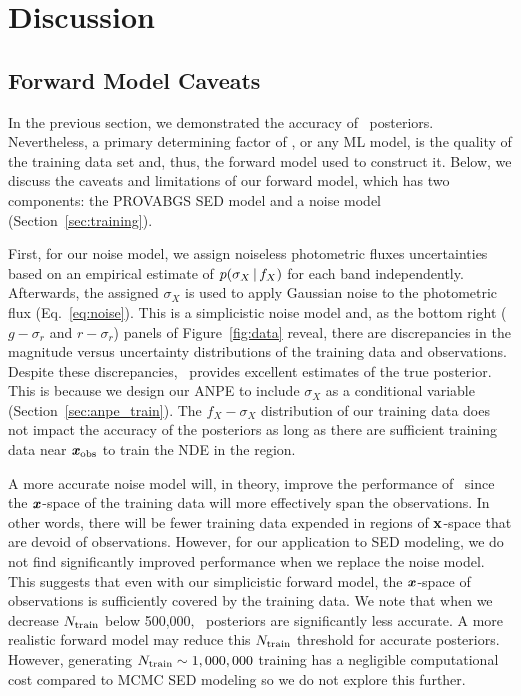 \section{Discussion} \label{sec:discuss}
\subsection{Forward Model Caveats} \label{sec:forward-model}
In the previous section, we demonstrated the accuracy of \sedflow~posteriors. 
Nevertheless, a primary determining factor of \sedflow, or any ML model, is
the quality of the training data set and, thus, the forward model used to
construct it. 
Below, we discuss the caveats and limitations of our forward model, which has
two components: the PROVABGS SED model and a noise model
(Section~\ref{sec:training}).

First, for our noise model, we assign noiseless photometric fluxes
uncertainties based on an empirical estimate of $p(\sigma_X\,|\, f_X)$ for
each band independently. 
Afterwards, the assigned $\sigma_X$ is used to apply Gaussian noise to the
photometric flux (Eq.~\ref{eq:noise}). 
This is a simplicistic noise model and, as the bottom right ($g - \sigma_r$ and
$r - \sigma_r$) panels of Figure~\ref{fig:data} reveal, there are discrepancies
in the magnitude versus uncertainty distributions of the training data and
observations. 
Despite these discrepancies, \sedflow~provides excellent estimates of the true
posterior.  
This is because we design our ANPE to include $\sigma_X$ as a conditional
variable (Section~\ref{sec:anpe_train}).
The $f_X-\sigma_X$ distribution of our training data does not impact the
accuracy of the posteriors as long as there are sufficient training data near
$\textbf{\textit{x}}_{\rm obs}$ to train the NDE in the region.

A more accurate noise model will, in theory, improve the performance of
\sedflow~since the $\textbf{\textit{x}}$-space of the training data will more effectively
span the observations. 
In other words, there will be fewer training data expended in regions of 
${\bf x}$-space that are devoid of observations.  
However, for our application to SED modeling, we do not find significantly  
improved performance when we replace the noise model.
This suggests that even with our simplicistic forward model, the
$\textbf{\textit{x}}$-space of observations is sufficiently covered by the training data. 
We note that when we decrease $N_{\rm train}$ below 500,000,
\sedflow~posteriors are significantly less accurate. 
A more realistic forward model may reduce this $N_{\rm train}$ threshold for
accurate posteriors. 
However, generating $N_{\rm train} \sim 1,000,000$ training has a negligible
computational cost compared to MCMC SED modeling so we do not explore this
further. 

